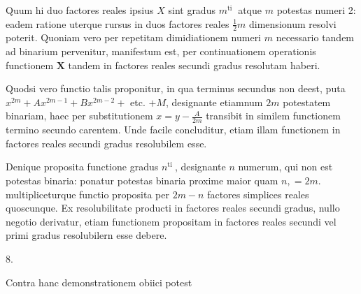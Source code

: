 \documentclass[10pt]{article}
\begin{document}
Quum hi duo factores reales ipsius \(X\) sint gradus \(m^{\text {ti }}\) atque \(m\) potestas numeri 2: eadem ratione uterque rursus in duos factores reales \(\frac{1}{2} m\) dimensionum resolvi poterit. Quoniam vero per repetitam dimidiationem numeri \(m\) necessario tandem ad binarium pervenitur, manifestum est, per continuationem operationis functionem \(\boldsymbol{X}\) tandem in factores reales secundi gradus resolutam haberi.

Quodsi vero functio talis proponitur, in qua terminus secundus non deest, puta \(x^{2 m}+A x^{2 m-1}+B x^{2 m-2}+\) etc. \(+M\), designante etiamnum \(2 m\) potestatem binariam, haec per substitutionem \(x=y-\frac{A}{2 m}\) transibit in similem functionem termino secundo carentem. Unde facile concluditur, etiam illam functionem in factores reales secundi gradus resolubilem esse.

Denique proposita functione gradus \(n^{\text {ti }}\), designante \(n\) numerum, qui non
est potestas binaria: ponatur potestas binaria proxime maior quam \(n,=2 m\). multipliceturque functio proposita per \(2 m-n\) factores simplices reales quoscunque. Ex resolubilitate producti in factores reales secundi gradus, nullo negotio derivatur, etiam functionem propositam in factores reales secundi vel primi gradus resolubilern esse debere.

8.

Contra hanc demonstrationem obiici potest
\end{document}
